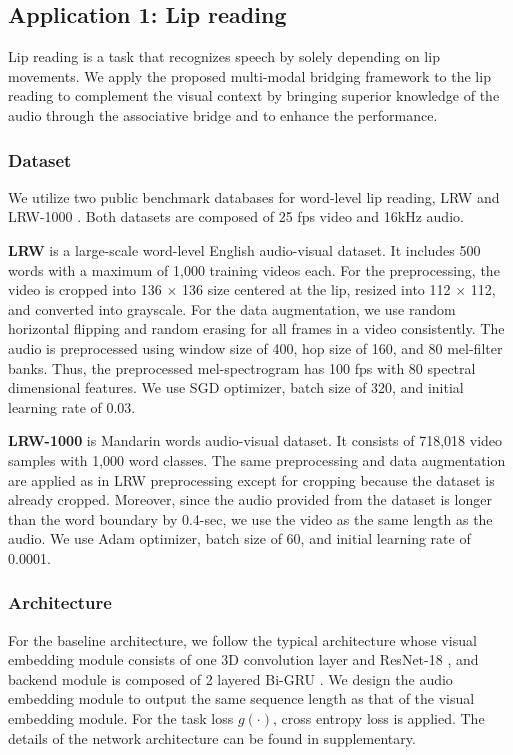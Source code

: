 \documentclass[10pt,twocolumn,letterpaper]{article}
\begin{document}
\subsection{Application 1: Lip reading}
\label{sec:4.1}
Lip reading is a task that recognizes speech by solely depending on lip movements. We apply the proposed multi-modal bridging framework to the lip reading to complement the visual context by bringing superior knowledge of the audio through the associative bridge and to enhance the performance.

\vspace{-0.3cm}
\subsubsection{Dataset}
\vspace{-0.2cm}
We utilize two public benchmark databases for word-level lip reading, LRW \cite{chung2016lrw} and LRW-1000 \cite{yang2019lrw1000}. Both datasets are composed of 25 fps video and 16kHz audio.

{\bf LRW} \cite{chung2016lrw} is a large-scale word-level English audio-visual dataset. It includes 500 words with a maximum of 1,000 training videos each. 
For the preprocessing, the video is cropped into 136 $\times$ 136 size centered at the lip, resized into 112 $\times$ 112, and converted into grayscale. For the data augmentation, we use random horizontal flipping and random erasing for all frames in a video consistently. The audio is preprocessed using window size of 400, hop size of 160, and 80 mel-filter banks. Thus, the preprocessed mel-spectrogram has 100 fps with 80 spectral dimensional features. We use SGD optimizer, batch size of 320, and initial learning rate of 0.03. 

{\bf LRW-1000} \cite{yang2019lrw1000} is Mandarin words audio-visual dataset. It consists of 718,018 video samples with 1,000 word classes. 
The same preprocessing and data augmentation are applied as in LRW preprocessing except for cropping because the dataset is already cropped. Moreover, since the audio provided from the dataset is longer than the word boundary by 0.4-sec, we use the video as the same length as the audio. We use Adam \cite{kingma2014adam} optimizer, batch size of 60, and initial learning rate of 0.0001.

\vspace{-0.3cm}
\subsubsection{Architecture}
For the baseline architecture, we follow the typical architecture \cite{petridis2018end, stafylakis2017reslstm} whose visual embedding module consists of one 3D convolution layer and ResNet-18 \cite{he2016resnet}, and backend module is composed of 2 layered Bi-GRU \cite{schuster1997bidirectional}. We design the audio embedding module to output the same sequence length as that of the visual embedding module. For the task loss $g(\cdot)$, cross entropy loss is applied.
The details of the network architecture can be found in supplementary.
\end{document}
